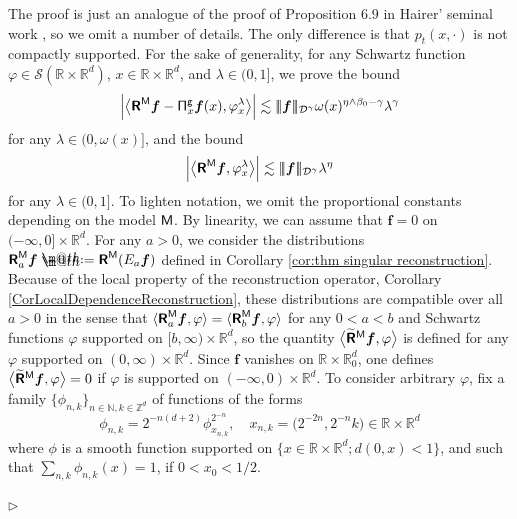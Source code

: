 \documentclass[10pt, reqno]{amsart}
\makeatletter
\numberwithin{subsection}{section}
\numberwithin{subsubsection}{subsection}
\numberwithin{equation}{section} %
\newenvironment{Dem}[1][\unskip]{%
    \begin{list}{\hspace{1.15cm}{\sf \textbf{{\small Proof #1 --}}}}{%
        \setlength{\topsep}{0pt}%
        \setlength{\leftmargin}{0pt}%
        \setlength{\rightmargin}{0pt}%
        \setlength{\listparindent}{0pt}%
        \setlength{\itemindent}{0pt}%
        \setlength{\parsep}{0pt}%
        \addtolength{\leftmargin}{0pt}%
        \addtolength{\rightmargin}{0pt}%
    } \item }{\hfill $\rhd$\end{list}\smallskip}
\theoremstyle{mystyle}
\theoremstyle{mystyle2}
\theoremstyle{mystyle3}
\newcommand{\trino}[1]{|\!|\!|#1|\!|\!|}
\newcommand{\bsf}{\boldsymbol{f}}
\newcommand\bbN{\mathbb{N}}
\newcommand\bbR{\mathbb{R}}
\newcommand\bbZ{\mathbb{Z}}
\newcommand{\mcD}{\mathcal{D}}
\newcommand\mcS{\mathcal{S}}
\newcommand*{\defeq}{\mathrel{\rlap{%
                     \raisebox{0.3ex}{$\m@th\cdot$}}%
                     \raisebox{-0.3ex}{$\m@th\cdot$}}%
                     =}
\makeatother
\begin{document}
\begin{Dem}[of Theorem \ref{thm singular reconstruction}]
The proof is just an analogue of the proof of Proposition 6.9 in Hairer' seminal work \cite{Hai14}, so we omit a number of details. The only difference is that $p_t(x,\cdot)$ is not compactly supported. For the sake of generality, for any Schwartz function $\varphi\in\mcS(\bbR\times\bbR^d)$, $x\in\bbR\times\bbR^d$, and $\lambda\in(0,1]$, we prove the bound
\begin{equation}\label{proof:eq1:thm singular reconstruction}
\left|\big\langle \textbf{\textsf{R}}^{\sf M}\bsf-{\sf\Pi}_x^{\sf g}\bsf(x),\varphi_x^\lambda \big\rangle\right|
\lesssim \trino{\bsf}_{\mcD^\gamma}\omega(x)^{\eta\wedge\beta_0-\gamma}\lambda^\gamma
\end{equation}
for any $\lambda\in(0,\omega(x)]$, and the bound
\begin{equation}\label{proof:eq2:thm singular reconstruction}
\left|\big\langle \textbf{\textsf{R}}^{\sf M}\bsf,\varphi_x^\lambda \big\rangle\right|
\lesssim \trino{\bsf}_{\mcD^\gamma}\lambda^\eta
\end{equation}
for any $\lambda\in(0,1]$. To lighten notation, we omit the proportional constants depending on the model $\sf M$.
By linearity, we can assume that $\bsf=0$ on $(-\infty,0]\times\bbR^d$. 
For any $a>0$, we consider the distributions $\textbf{\textsf{R}}_a^{\sf M}\bsf\defeq \textbf{\textsf{R}}^{\sf M}(E_a\bsf)$ defined in Corollary \ref{cor:thm singular reconstruction}.
Because of the local property of the reconstruction operator, Corollary \ref{CorLocalDependenceReconstruction}, these distributions are compatible over all $a>0$ in the sense that $\langle \textbf{\textsf{R}}_a^{\sf M}\bsf,\varphi\rangle=\langle \textbf{\textsf{R}}_b^{\sf M}\bsf,\varphi\rangle$ for any $0<a<b$ and Schwartz functions $\varphi$ supported on $[b,\infty)\times\bbR^d$, so the quantity $\big\langle \widetilde{\textbf{\textsf{R}}}{}^{\sf M}\bsf,\varphi \big\rangle$ is defined for any $\varphi$ supported on $(0,\infty)\times\bbR^d$. Since $\bsf$ vanishes on $\bbR\times\bbR^d_0$, one defines $\big\langle \widetilde{\textbf{\textsf{R}}}{}^{\sf M}\bsf,\varphi \big\rangle=0$ if $\varphi$ is supported on $(-\infty,0)\times\bbR^d$. 
To consider arbitrary $\varphi$, fix a family $\{\phi_{n,k}\}_{n\in\bbN,k\in\bbZ^d}$ of functions of the forms
$$
\phi_{n,k}=2^{-n(d+2)}\phi_{x_{n,k}}^{2^{-n}}, \quad x_{n,k}=\big(2^{-2n},2^{-n}k\big)\in\bbR\times\bbR^d
$$
where $\phi$ is a smooth function supported on $\big\{x\in\bbR\times\bbR^d;d(0,x)<1\big\}$, and such that $\sum_{n,k}\phi_{n,k}(x)=1$, if $0<x_0<1/2$. 

\end{Dem}
\end{document}
